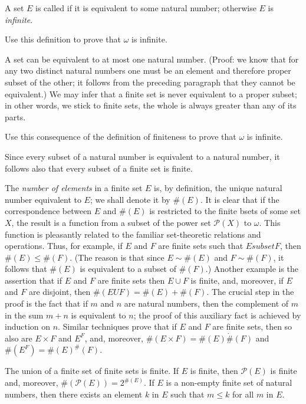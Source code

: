 A set $E$ is called  if it is equivalent to some natural number; otherwise $E$ is \textit{infinite}.
 
\begin{named}[Exercise. ] Use this definition to prove that $\omega$ is infinite.
\end{named}

A set can be equivalent to at most one natural number. (Proof: we know that for any two distinct natural numbers one must be an element and therefore proper subset of the other; it follows from the preceding paragraph that they cannot be equivalent.) We may infer that a finite set is never equivalent to a proper subset; in other words, we stick to finite sets, the whole is always greater than any of its parts. 

\begin{named} [Exercise. ] Use this consequence of the definition of finiteness to prove that $\omega$ is infinite. 
\end{named}

Since every subset of a natural number is equivalent to a natural number, it follows also that every subset of a finite set is finite. 

The \textit{number of elements} in a finite set $E$ is, by definition, the unique natural number equivalent to $E$; we shall denote it by $\# (E)$. It is clear that if the correspondence between $E$ and $\# (E)$ is restricted to the finite bsets of some set $X$, the result is a function from a subset of the power set $\mathcal{P}(X)$ to $\omega$. This function is pleasantly related to the familiar set-theoretic relations and operations. Thus, for example, if $E$ and $F$ are finite sets such that $E subset F$, then $\# (E) \le \# (F)$. (The reason is that since $E \sim \# (E)$ and $F \sim \# (F)$, it follows that $\# (E)$ is equivalent to a subset of $\# (F)$.) Another example is the assertion that if $E$ and $F$ are finite sets then $E \cup F$ is finite, and, moreover, if $E$ and $F$ are disjoint, then $\# (E U F) = \# (E) + \# (F)$. The crucial step in the proof is the fact that if $m$ and $n$ are natural numbers, then the complement of $m$ in the sum $m + n$ is equivalent to $n$; the proof of this auxiliary fact is achieved by induction on $n$. Similar techniques prove that if $E$ and $F$ are finite sets, then so also are $E \times F$ and $E^{F}$, and, moreover, $\# (E \times F) = \# (E) \dot \# (F)$ and  $\# (E^{F}) = \# (E)^\# (F)$. 

\begin{named}[Exercise. ] The union of a finite set of finite sets is finite. If $E$ is finite, then $\mathcal{P}(E)$ is finite and, moreover, $\# (\mathcal{P}(E)) = 2^{\# (E)}$. If $E$ is a non-empty finite set of natural numbers, then there exists an element $k$ in $E$ such that $m \le k$ for all $m$ in $E$. 
\end{named}
